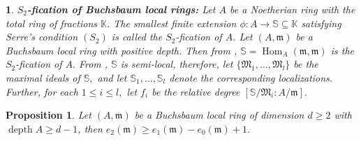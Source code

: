 \documentclass[11pt]{amsart}
\theoremstyle{plain}
\newtheorem{proposition}[theorem]{Proposition}
\newtheorem{point}[theorem]{}
\newcommand{\m}{\mathfrak{m}}
\newcommand{\depth}{\operatorname{depth}}
\newcommand{\Hom}{\operatorname{Hom}}
\theoremstyle{plain}
\begin{document}
\begin{point} \normalfont \cite[Section 4]{GHEZZI_GOTO_HONG_VASCONCELOS_2017} \textbf{$S_{2}$-fication of  Buchsbaum local rings:}   Let $A$ be a Noetherian ring with the total ring of fractions $\mathbb K$. The smallest finite extension $\phi: A\longrightarrow \mathbb S \subseteq \mathbb K$ satisfying Serre's condition $(S_{2})$ is called the $S_{2}$-fication of $A$. Let $(A,\m)$ be a Buchsbaum local ring with positive depth.  Then from \cite[Theorem 4.2]{GHEZZI_GOTO_HONG_VASCONCELOS_2017}, $\mathbb S=\Hom_{A}(\m,\m)$ is the $S_{2}$-fication of $A.$ From \cite[Proposition 4.1(2)]{GHEZZI_GOTO_HONG_VASCONCELOS_2017},  $\mathbb S$ is semi-local, therefore, let $\{\mathfrak M_{1},\ldots, \mathfrak M_{l}\}$ be the maximal ideals of $\mathbb S,$ and let $\mathbb S_{1},\ldots,\mathbb S_{l}$ denote the corresponding localizations. Further, for each $1\leq i\leq l,$ let $f_{i}$ be the relative degree $[\mathbb S/\mathfrak M_{i}:A/\mathfrak m].$
\end{point}




\begin{proposition} \label{buchsbaumring}
    Let $(A,\m)$ be a Buchsbaum local ring of dimension $d \geq 2$ with $\depth A\geq d-1$, then $e_{2}(\m)\geq e_{1}(\m)-e_{0}(\m)+1.$
\end{proposition}
\end{document}
